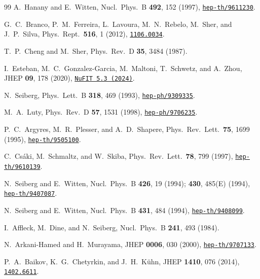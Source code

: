 \documentclass[12pt,a4paper]{article}
\begin{document}
\begin{thebibliography}{99}
  A.~Hanany and E.~Witten,
  Nucl.\ Phys.\ B \textbf{492}, 152 (1997),
  \href{https://arxiv.org/abs/hep-th/9611230}{\texttt{hep-th/9611230}}.

  G.~C.~Branco, P.~M.~Ferreira, L.~Lavoura, M.~N.~Rebelo,
  M.~Sher, and J.~P.~Silva,
  Phys.\ Rept.\ \textbf{516}, 1 (2012),
  \href{https://arxiv.org/abs/1106.0034}{\texttt{1106.0034}}.

  T.~P.~Cheng and M.~Sher,
  Phys.\ Rev.\ D \textbf{35}, 3484 (1987).

  I.~Esteban, M.~C.~Gonzalez-Garcia, M.~Maltoni,
  T.~Schwetz, and A.~Zhou,
  JHEP \textbf{09}, 178 (2020),
  \href{http://www.nu-fit.org}{\texttt{NuFIT 5.3 (2024)}}.

  N.~Seiberg,
  Phys.\ Lett.\ B \textbf{318}, 469 (1993),
  \href{https://arxiv.org/abs/hep-ph/9309335}{\texttt{hep-ph/9309335}}.

  M.~A.~Luty,
  Phys.\ Rev.\ D \textbf{57}, 1531 (1998),
  \href{https://arxiv.org/abs/hep-ph/9706235}{\texttt{hep-ph/9706235}}.

  P.~C.~Argyres, M.~R.~Plesser, and A.~D.~Shapere,
  Phys.\ Rev.\ Lett.\ \textbf{75}, 1699 (1995),
  \href{https://arxiv.org/abs/hep-th/9505100}{\texttt{hep-th/9505100}}.

  C.~Cs\'aki, M.~Schmaltz, and W.~Skiba,
  Phys.\ Rev.\ Lett.\ \textbf{78}, 799 (1997),
  \href{https://arxiv.org/abs/hep-th/9610139}{\texttt{hep-th/9610139}}.

  N.~Seiberg and E.~Witten,
  Nucl.\ Phys.\ B \textbf{426}, 19 (1994);
  \textbf{430}, 485(E) (1994),
  \href{https://arxiv.org/abs/hep-th/9407087}{\texttt{hep-th/9407087}}.

  N.~Seiberg and E.~Witten,
  Nucl.\ Phys.\ B \textbf{431}, 484 (1994),
  \href{https://arxiv.org/abs/hep-th/9408099}{\texttt{hep-th/9408099}}.

  I.~Affleck, M.~Dine, and N.~Seiberg,
  Nucl.\ Phys.\ B \textbf{241}, 493 (1984).

  N.~Arkani-Hamed and H.~Murayama,
  JHEP \textbf{0006}, 030 (2000),
  \href{https://arxiv.org/abs/hep-th/9707133}{\texttt{hep-th/9707133}}.

  P.~A.~Baikov, K.~G.~Chetyrkin, and J.~H.~K\"uhn,
  JHEP \textbf{1410}, 076 (2014),
  \href{https://arxiv.org/abs/1402.6611}{\texttt{1402.6611}}.


\end{thebibliography}
\end{document}
